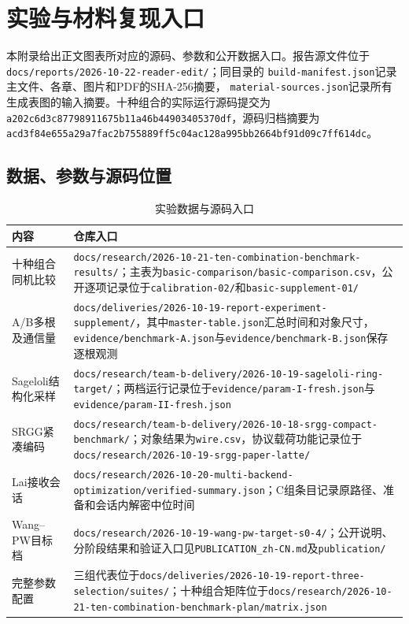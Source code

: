 \chapter{实验与材料复现入口}

本附录给出正文图表所对应的源码、参数和公开数据入口。报告源文件位于
\nolinkurl{docs/reports/2026-10-22-reader-edit/}；同目录的
\nolinkurl{build-manifest.json}记录主文件、各章、图片和PDF的SHA-256摘要，
\nolinkurl{material-sources.json}记录所有生成表图的输入摘要。十种组合的实际运行源码提交为
\texttt{a202c6d3c87798911675b11a46b44903405370df}，源码归档摘要为
\texttt{acd3f84e655a29a7fac2b755889ff5c04ac128a995bb2664bf91d09c7ff614dc}。

\section{数据、参数与源码位置}

\begin{longtable}{@{}>{\raggedright\arraybackslash}p{}>{\raggedright\arraybackslash}p{}@{}}
\caption{实验数据与源码入口}\label{tab:reproduction-index}\\
\toprule
\rowcolor{black!8} 内容 & 仓库入口 \\
\midrule
十种组合同机比较 & \nolinkurl{docs/research/2026-10-21-ten-combination-benchmark-results/}；主表为\nolinkurl{basic-comparison/basic-comparison.csv}，公开逐项记录位于\nolinkurl{calibration-02/}和\nolinkurl{basic-supplement-01/} \\
A/B多根及通信量 & \nolinkurl{docs/deliveries/2026-10-19-report-experiment-supplement/}，其中\nolinkurl{master-table.json}汇总时间和对象尺寸，\nolinkurl{evidence/benchmark-A.json}与\nolinkurl{evidence/benchmark-B.json}保存逐根观测 \\
Sageloli结构化采样 & \nolinkurl{docs/research/team-b-delivery/2026-10-19-sageloli-ring-target/}；两档运行记录位于\nolinkurl{evidence/param-I-fresh.json}与\nolinkurl{evidence/param-II-fresh.json} \\
SRGG紧凑编码 & \nolinkurl{docs/research/team-b-delivery/2026-10-18-srgg-compact-benchmark/}；对象结果为\nolinkurl{wire.csv}，协议载荷功能记录位于\nolinkurl{docs/research/2026-10-19-srgg-paper-latte/} \\
Lai接收会话 & \nolinkurl{docs/research/2026-10-20-multi-backend-optimization/verified-summary.json}；C组条目记录原路径、准备和会话内解密中位时间 \\
Wang--PW目标档 & \nolinkurl{docs/research/2026-10-19-wang-pw-target-s0-4/}；公开说明、分阶段结果和验证入口见\nolinkurl{PUBLICATION_zh-CN.md}及\nolinkurl{publication/} \\
完整参数配置 & 三组代表位于\nolinkurl{docs/deliveries/2026-10-19-report-three-selection/suites/}；十种组合矩阵位于\nolinkurl{docs/research/2026-10-21-ten-combination-benchmark-plan/matrix.json} \\
\bottomrule
\end{longtable}

